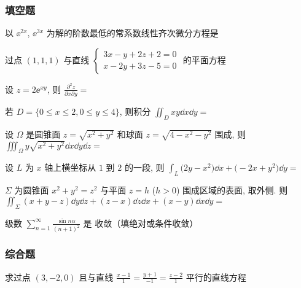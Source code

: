 \subsubsection{填空题}
\begin{ti}
	以 $\ee^{2x}$, $\ee^{3x}$ 为解的阶数最低的常系数线性齐次微分方程是 \hua{}
\end{ti}

\begin{ti}
	过点 $(1,1,1)$ 与直线 $\begin{cases}
		3x - y + 2z + 2 = 0 \\
		x - 2y + 3z - 5 = 0
	\end{cases}$ 的平面方程 \hua{}
\end{ti}

\begin{ti}
	设 $z = 2\ee^{xy}$, 则 $\frac{\partial^2 z}{\partial x \partial y} =$ \hua{}
\end{ti}

\begin{ti}
	若 $D = \{ 0 \leqslant x \leqslant 2, 0 \leqslant y \leqslant 4 \}$, 则积分 $\iint_D xy \dd{x} \dd{y} =$ \hua{}
\end{ti}

\begin{ti}
	设 $\Omega$ 是圆锥面 $z = \sqrt{x^2+y^2}$ 和球面 $z = \sqrt{4-x^2-y^2}$ 围成, 则 $\iiint_{\Omega} y \sqrt{x^2+y^2} \dd{x} \dd{y} \dd{z} =$ \hua{}
\end{ti}

\begin{ti}
	设 $L$ 为 $x$ 轴上横坐标从 $1$ 到 $2$ 的一段, 则 $\int_L \bigl( 2y - x^2 \bigr) \dd{x} + \bigl( -2x + y^2 \bigr) \dd{y} =$ \hua{}
\end{ti}

\begin{ti}
	$\Sigma$ 为圆锥面 $x^2 + y^2 = z^2$ 与平面 $z = h$ ($h > 0$) 围成区域的表面, 取外侧. 则 $\iint_{\Sigma} (x + y - z) \dd{y} \dd{z} + (z - x) \dd{z} \dd{x} + (x - y) \dd{x} \dd{y} =$ \hua{}
\end{ti}

\begin{ti}
	级数 $\sum_{n=1}^{\infty} \frac{\sin n \alpha}{(n+1)^2}$ 是 \hua{} 收敛（填绝对或条件收敛）
\end{ti}

\subsubsection{综合题}
\begin{ti}
	求过点 $(3,-2,0)$ 且与直线 $\frac{x-1}{1} = \frac{y+1}{-1} = \frac{z-2}{1}$ 平行的直线方程
\end{ti}

